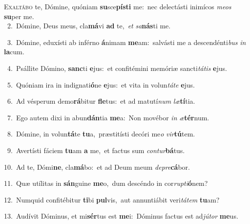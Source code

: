 \lettrine{\initial\textcolor{\initialcolor}{E}}{xaltábo} te, Dómine, quóniam \textbf{su}\-sce\-\textbf{pís}\-\textbf{ti} me:~\star nec delectásti inimícos \textit{me}\-\textit{os} \textbf{su}\-per me.\\
{\numbfont\textcolor{\numbcolor}{~2.}}~Dómine, Deus meus, cla\-\textbf{má}\-vi \textbf{ad} te,~\star \textit{et} \textit{sa}\-\textbf{nás}ti me.\par
{\numbfont\textcolor{\numbcolor}{~3.}}~Dómine, eduxísti ab inférno \textbf{á}\-nimam \textbf{me}\-am:~\star salvásti me a descendénti\textit{bus} \textit{in} \textbf{la}\-cum.\par
{\numbfont\textcolor{\numbcolor}{~4.}}~Psállite Dómino, \textbf{sanc}\-ti \textbf{e}\-jus:~\star et confitémini memóriæ sancti\-\textit{tá}\-\textit{tis} \textbf{e}\-jus.\par
{\numbfont\textcolor{\numbcolor}{~5.}}~Quóniam ira in indignati\-\textbf{ó}\-ne \textbf{e}\-jus:~\star et vita in volun\-\textit{tá}\-\textit{te} \textbf{e}\-jus.\par
{\numbfont\textcolor{\numbcolor}{~6.}}~Ad vésperum demo\-\textbf{rá}\-bitur \textbf{fle}\-tus:~\star et ad matutí\textit{num} \textit{læ}\-\textbf{tí}tia.\par
{\numbfont\textcolor{\numbcolor}{~7.}}~Ego autem dixi in abun\-\textbf{dán}\-tia \textbf{me}\-a:~\star Non movébor \textit{in} \textit{æ}\-\textbf{tér}num.\par
{\numbfont\textcolor{\numbcolor}{~8.}}~Dómine, in volun\-\textbf{tá}\-te \textbf{tu}\-a,~\star præstitísti decóri me\textit{o} \textit{vir}\-\textbf{tú}tem.\par
{\numbfont\textcolor{\numbcolor}{~9.}}~Avertísti fáciem \textbf{tu}\-am \textbf{a} me,~\star et factus sum \textit{con}\-\textit{tur}\textbf{bá}tus.\par
{\numbfont\textcolor{\numbcolor}{10.}}~Ad te, Dómi\-\textbf{ne}\-, cla\-\textbf{má}\-bo:~\star et ad Deum meum \textit{de}\-\textit{pre}\textbf{cá}bor.\par
{\numbfont\textcolor{\numbcolor}{11.}}~Quæ utílitas in \textbf{sán}\-guine \textbf{me}\-o,~\star dum descéndo in cor\-\textit{rup}\-\textit{ti}\textbf{ó}nem?\par
{\numbfont\textcolor{\numbcolor}{12.}}~Numquid confitébitur \textbf{ti}\-bi \textbf{pul}\-vis,~\star aut annuntiábit veri\-\textit{tá}\-\textit{tem} \textbf{tu}\-am?\par
{\numbfont\textcolor{\numbcolor}{13.}}~Audívit Dóminus, et mi\-\textbf{sér}\-tus est \textbf{me}\-i:~\star Dóminus factus est ad\-\textit{jú}\-\textit{tor} \textbf{me}\-us.\par
